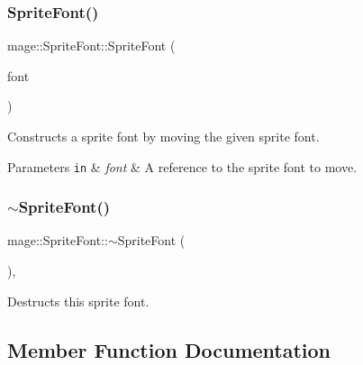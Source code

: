 \subsubsection{\texorpdfstring{Sprite\+Font()}{SpriteFont()}\hspace{0.1cm}{\footnotesize\ttfamily [4/4]}}
{\footnotesize\ttfamily mage\+::\+Sprite\+Font\+::\+Sprite\+Font (\begin{DoxyParamCaption}\item[{\hyperlink{classmage_1_1_sprite_font}{Sprite\+Font} \&\&}]{font }\end{DoxyParamCaption})\hspace{0.3cm}{\ttfamily [default]}}

Constructs a sprite font by moving the given sprite font.


\begin{DoxyParams}[1]{Parameters}
\mbox{\tt in}  & {\em font} & A reference to the sprite font to move. \\
\hline
\end{DoxyParams}
\hypertarget{classmage_1_1_sprite_font_acbf50687b4a5dbb2ff1ad73ecc89b7f1}{}\label{classmage_1_1_sprite_font_acbf50687b4a5dbb2ff1ad73ecc89b7f1} 
\subsubsection{\texorpdfstring{$\sim$\+Sprite\+Font()}{~SpriteFont()}}
{\footnotesize\ttfamily mage\+::\+Sprite\+Font\+::$\sim$\+Sprite\+Font (\begin{DoxyParamCaption}{ }\end{DoxyParamCaption})\hspace{0.3cm}{\ttfamily [virtual]}, {\ttfamily [default]}}

Destructs this sprite font. 

\subsection{Member Function Documentation}
\hypertarget{classmage_1_1_sprite_font_a01836c4197661dbdd66c624d8dc6a7c3}{}\label{classmage_1_1_sprite_font_a01836c4197661dbdd66c624d8dc6a7c3} 

